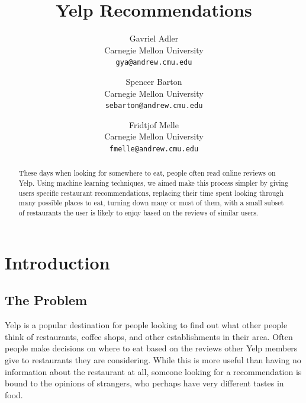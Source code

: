 \documentclass[10pt,twocolumn,letterpaper]{article}
\begin{document}
\title{Yelp Recommendations}

\author{
Gavriel Adler\\
Carnegie Mellon University\\
{\tt\small gya@andrew.cmu.edu}
\and
Spencer Barton\\
Carnegie Mellon University\\
{\tt\small sebarton@andrew.cmu.edu}
\and
Fridtjof Melle\\
Carnegie Mellon University\\
{\tt\small fmelle@andrew.cmu.edu}
}

\maketitle

\begin{abstract}
   These days when looking for somewhere to eat, people often read online reviews on Yelp. Using machine learning techniques, we aimed make this process simpler by giving users specific restaurant recommendations, replacing their time spent looking through many possible places to eat, turning down many or most of them, with a small subset of restaurants the user is likely to enjoy based on the reviews of similar users.

   
\end{abstract}

\section{Introduction}

\subsection{The Problem}
Yelp is a popular destination for people looking to find out what other people think of restaurants, coffee shops, and other establishments in their area. Often people make decisions on where to eat based on the reviews other Yelp members give to restaurants they are considering. While this is more useful than having no information about the restaurant at all, someone looking for a recommendation is bound to the opinions of strangers, who perhaps have very different tastes in food. 
\end{document}
